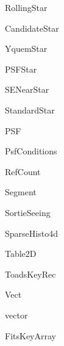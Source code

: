 \begin{CompactList}
\begin{CompactList}
\begin{CompactList}
\item Rolling\-Star\item {}
\begin{CompactList}
\item Candidate\-Star\begin{CompactList}
\item Yquem\-Star\end{CompactList}
\item PSFStar\item SENear\-Star\end{CompactList}
\item Standard\-Star\end{CompactList}
\end{CompactList}
\item PSF\item Psf\-Conditions\item {}
\begin{CompactList}
\item {}
\end{CompactList}
\item Ref\-Count\begin{CompactList}
\item {}
\item {}
\item {}
\end{CompactList}
\item Segment\item Sortie\-Seeing\item Sparse\-Histo4d\item {}
\item {}
\item {}
\item Table2D\item Toads\-Key\-Rec\item Vect\item vector\begin{CompactList}
\item Fits\-Key\-Array\item {}

\end{CompactList}
\end{CompactList}
